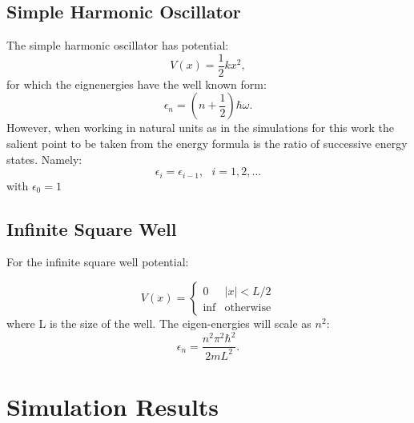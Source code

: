 \documentclass[]{article}
\begin{document}
\subsection{Simple Harmonic Oscillator}
The simple harmonic oscillator has potential:
\begin{equation}
V(x) = \frac{1}{2}kx^2,
\label{eq:sho-v}
\end{equation}
for which the eignenergies have the well known form:
\begin{equation}
\epsilon_n = (n+\frac{1}{2})\hbar\omega.
\end{equation}
However, when working in natural units as in the simulations for this work the salient point to be taken from the energy formula is the ratio of successive energy states. Namely:
\begin{equation}
\epsilon_i = \epsilon_{i-1}, \text{ }i=1,2,\dots
\end{equation}
with $\epsilon_0 = 1$
\subsection{Infinite Square Well}
For the infinite square well potential:

\begin{equation}\label{ch:five:sec:5:eq4:1}
V(x)=
\begin{cases} 
0 & |x| < L/2 \\
\inf & \text{otherwise}
\end{cases}
\end{equation}
where L is the size of the well. The eigen-energies will scale as $n^2$:
\begin{equation}
\epsilon_n = \frac{n^2\pi^2\hbar^2}{2mL^2}.
\end{equation}
\section{Simulation Results}
\end{document}
